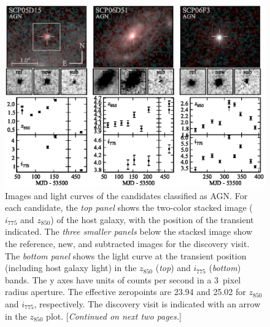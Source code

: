 

\begin{figure}[!b]
\includegraphics[width=\textwidth]{figures/cands/agn1.eps}
\caption[Images and light curves of candidates classified as AGN]
        {Images and light curves of the candidates classified as
          AGN. For each candidate, the \emph{top panel} shows the
          two-color stacked image ($i_{775}$ and $z_{850}$) of the
          host galaxy, with the position of the transient indicated.
          The \emph{three smaller panels} below the stacked image show the
          reference, new, and subtracted images for the discovery
          visit. The \emph{bottom panel} shows the light curve at the transient
          position (including host galaxy light) in the $z_{850}$
          ({\it top}) and $i_{775}$ ({\it bottom}) bands. The y axes
          have units of counts per second in a $3$~pixel radius
          aperture. The effective zeropoints are 23.94 and 25.02 for
          $z_{850}$ and $i_{775}$, respectively. The discovery visit
          is indicated with an arrow in the $z_{850}$
          plot. [\emph{Continued on next two pages.}]\label{fig:agn}}
\end{figure}

